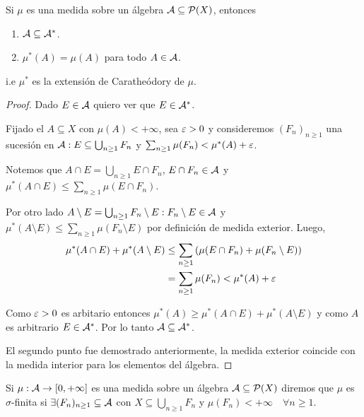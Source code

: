 \begin{corollary}
    Si $\mu$ es una medida sobre un álgebra $\mathcal{A} \subseteq \mathcal{P}(X)$, entonces \begin{enumerate}
        \item $\mathcal{A} \subseteq \mathcal{A}^*$.
        \item $\mu^*(A) = \mu(A)$ para todo $A \in \mathcal{A}$.
    \end{enumerate}
    i.e $\mu^*$ es la extensión de Caratheódory de $\mu$.
    \begin{proof}
        Dado $E \in \mathcal{A}$ quiero ver que $E \in \mathcal{A}^*$.

        Fijado el $A \subseteq X$ con $\mu(A) < +\infty$, sea $\varepsilon > 0$ y consideremos $(F_n)_{n \geq 1}$ una sucesión en $\mathcal{A}
            : E \subseteq \bigcup_{n \geq 1} F_n$ y $\sum_{n \geq 1} \mu(F_n) < \mu^*(A) + \varepsilon$.

        Notemos que $A \cap E = \bigcup_{n \geq 1} E \cap F_n$, $E \cap F_n \in \mathcal{A}$ y $\mu^*(A \cap E) \leq \sum_{n \geq 1} \mu(E \cap F_n)$.

        Por otro lado $A \setminus E = \bigcup_{n \geq 1} F_n \setminus E : F_n \setminus E \in \mathcal{A}$ y $\mu^*(A \setminus E) \leq \sum_{n \geq 1} \mu(F_n \setminus E)$ por definición de medida exterior.
        Luego, \begin{align*}
            \mu^*(A \cap E) + \mu^*(A \setminus E) & \leq \sum_{n \geq 1} \left( \mu(E \cap F_n) + \mu(F_n \setminus E) \right) \\
                                                   & = \sum_{n \geq 1} \mu(F_n) < \mu^*(A) + \varepsilon                                 \\
        \end{align*}

        Como $\varepsilon > 0$ es arbitario entonces $\mu^*(A) \geq \mu^*(A \cap E) + \mu^*(A \setminus E)$ y como $A$ es arbitrario $E \in \mathcal{A}^*$.
        Por lo tanto $\mathcal{A} \subseteq \mathcal{A}^*$.

        El segundo punto fue demostrado anteriormente, la medida exterior coincide con la medida interior para los elementos del álgebra.
    \end{proof}
\end{corollary}

\begin{definition}
    Si $\mu : \mathcal{A} \to [0, +\infty]$ es una medida sobre un álgebra $\mathcal{A} \subseteq \mathcal{P}(X)$ diremos que $\mu$ es $\sigma$-finita si $\exists (F_n)_{n \geq 1} \subseteq \mathcal{A}$ con $X \subseteq \bigcup_{n \geq 1} F_n$ y $\mu(F_n) < +\infty \quad \forall n \geq 1$.
\end{definition}

